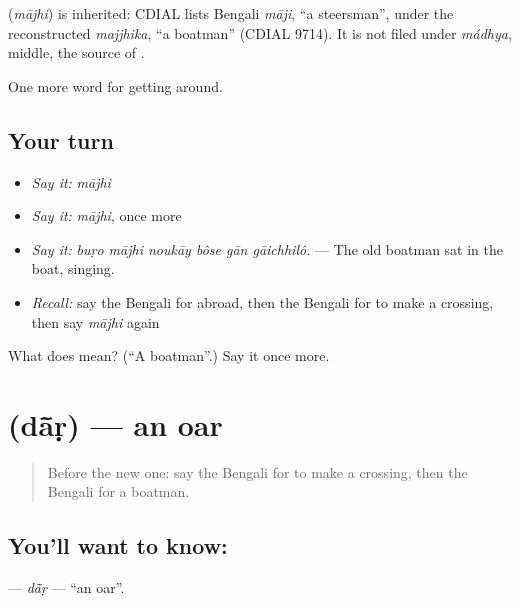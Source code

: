\begin{cousinweb}
\textbf{} (\emph{mājhi}) is inherited: CDIAL lists Bengali \emph{māji}, \textquotedblleft{}a steersman\textquotedblright{}, under the reconstructed \emph{majjhika}, \textquotedblleft{}a boatman\textquotedblright{} (CDIAL 9714). It is not filed under \emph{mádhya}, middle, the source of .
\end{cousinweb}

\begin{grammarlens}[title={What you've built}]
One more word for getting around.
\end{grammarlens}

\subsection*{Your turn}
\begin{itemize}
\raggedright
  \item \emph{Say it:} \emph{mājhi}
  \item \emph{Say it:} \emph{mājhi}, once more
  \item \emph{Say it:} \emph{buṛo mājhi noukāy bôse gān gāichhilô.} — The old boatman sat in the boat, singing.
  \item \emph{Recall:} say the Bengali for abroad, then the Bengali for to make a crossing, then say \emph{mājhi} again
\end{itemize}

\begin{tcolorbox}[breakable,colback=teal!4,colframe=teal!35!black,title={Before you move on}]
What does  mean? (\textquotedblleft{}A boatman\textquotedblright{}.) Say it once more.
\end{tcolorbox}
\section[\texorpdfstring{\bn{দাঁড়} (dā̃ṛ)}{দাঁড় (dā̃ṛ)}]{ (dā̃ṛ) — an oar}

\label{lesson:BN-C396-dar}



\begin{quote}
Before the new one: say the Bengali for to make a crossing, then the Bengali for a boatman.
\end{quote}

\subsection*{You'll want to know: }
\textbf{} — \emph{dā̃ṛ} — \textquotedblleft{}an oar\textquotedblright{}.

